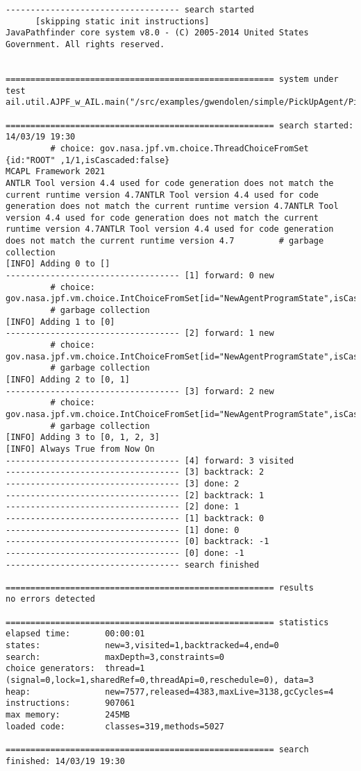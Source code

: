 \noindent \begin{lstlisting}
----------------------------------- search started
      [skipping static init instructions]
JavaPathfinder core system v8.0 - (C) 2005-2014 United States Government. All rights reserved.


====================================================== system under test
ail.util.AJPF_w_AIL.main("/src/examples/gwendolen/simple/PickUpAgent/PickUpAgent.ail","/src/examples/gwendolen/simple/PickUpAgent/PickUpAgent.psl","0")

====================================================== search started: 14/03/19 19:30
		 # choice: gov.nasa.jpf.vm.choice.ThreadChoiceFromSet {id:"ROOT" ,1/1,isCascaded:false}
MCAPL Framework 2021
ANTLR Tool version 4.4 used for code generation does not match the current runtime version 4.7ANTLR Tool version 4.4 used for code generation does not match the current runtime version 4.7ANTLR Tool version 4.4 used for code generation does not match the current runtime version 4.7ANTLR Tool version 4.4 used for code generation does not match the current runtime version 4.7		 # garbage collection
[INFO] Adding 0 to []
----------------------------------- [1] forward: 0 new
		 # choice: gov.nasa.jpf.vm.choice.IntChoiceFromSet[id="NewAgentProgramState",isCascaded:false,>0]
		 # garbage collection
[INFO] Adding 1 to [0]
----------------------------------- [2] forward: 1 new
		 # choice: gov.nasa.jpf.vm.choice.IntChoiceFromSet[id="NewAgentProgramState",isCascaded:false,>0]
		 # garbage collection
[INFO] Adding 2 to [0, 1]
----------------------------------- [3] forward: 2 new
		 # choice: gov.nasa.jpf.vm.choice.IntChoiceFromSet[id="NewAgentProgramState",isCascaded:false,>0]
		 # garbage collection
[INFO] Adding 3 to [0, 1, 2, 3]
[INFO] Always True from Now On
----------------------------------- [4] forward: 3 visited
----------------------------------- [3] backtrack: 2
----------------------------------- [3] done: 2
----------------------------------- [2] backtrack: 1
----------------------------------- [2] done: 1
----------------------------------- [1] backtrack: 0
----------------------------------- [1] done: 0
----------------------------------- [0] backtrack: -1
----------------------------------- [0] done: -1
----------------------------------- search finished

====================================================== results
no errors detected

====================================================== statistics
elapsed time:       00:00:01
states:             new=3,visited=1,backtracked=4,end=0
search:             maxDepth=3,constraints=0
choice generators:  thread=1 (signal=0,lock=1,sharedRef=0,threadApi=0,reschedule=0), data=3
heap:               new=7577,released=4383,maxLive=3138,gcCycles=4
instructions:       907061
max memory:         245MB
loaded code:        classes=319,methods=5027

====================================================== search finished: 14/03/19 19:30
\end{lstlisting}

